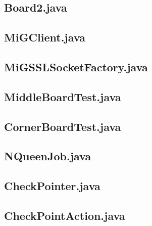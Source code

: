 \begin{landscape}
\subsection{Board2.java}

\subsection{MiGClient.java}

\subsection{MiGSSLSocketFactory.java}

\subsection{MiddleBoardTest.java}

\subsection{CornerBoardTest.java}

\subsection{NQueenJob.java}

\subsection{CheckPointer.java}

\subsection{CheckPointAction.java}


\end{landscape}
